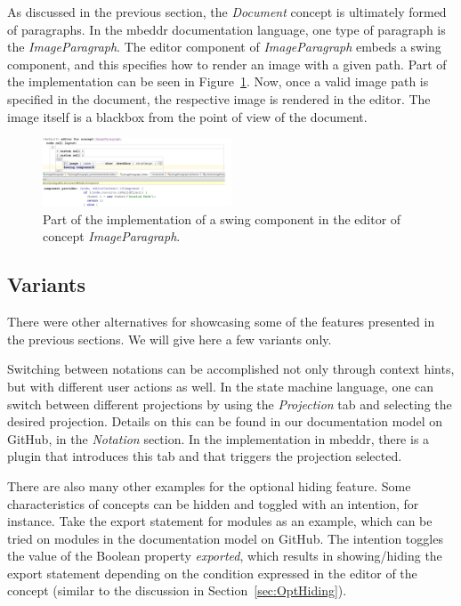 \documentclass[preprint,numbers,10pt]{sigplanconf}
\begin{document}
As discussed in the previous section, the \emph{Document} concept is ultimately formed of paragraphs.
In the mbeddr documentation language, one type of paragraph is the \emph{ImageParagraph}. The editor
component of \emph{ImageParagraph} embeds a swing component, and this specifies how to render an image
with a given path. Part of the implementation can be seen in Figure~\ref{fig:EditorImageParagraph}.
Now, once a valid image path is specified in the document, the respective image
is rendered in the editor. The image itself is a blackbox from the point of view of the document.

\begin{figure}[H]
	\centering
	\includegraphics[width=0.50\textwidth]{screens/EditorImageParagraph.png}
	\caption{Part of the implementation of a swing component in the editor of concept \emph{ImageParagraph}.}
	\label{fig:EditorImageParagraph}
\end{figure}

\subsection{Variants}
There were other alternatives for showcasing some of the features presented in the previous sections.
We will give here a few variants only.

Switching between notations can be accomplished not only through context hints, but with
different user actions as well. In the state machine language, one can switch between different
projections by using the \emph{Projection} tab and selecting the desired projection. Details on this
can be found in our documentation model on GitHub, in the \emph{Notation} section. In the implementation in mbeddr,
there is a plugin that introduces this tab and that triggers the projection selected.

There are also many other examples for the optional hiding feature. Some characteristics of concepts
can be hidden and toggled with an intention, for instance. Take the export statement for modules as an example, which can
be tried on modules in the documentation model on GitHub. The intention toggles the value of the Boolean property \emph{exported},
which results in showing/hiding the export statement depending on the condition expressed in the editor of the concept
(similar to the discussion in Section~\ref{sec:OptHiding}).
\end{document}
